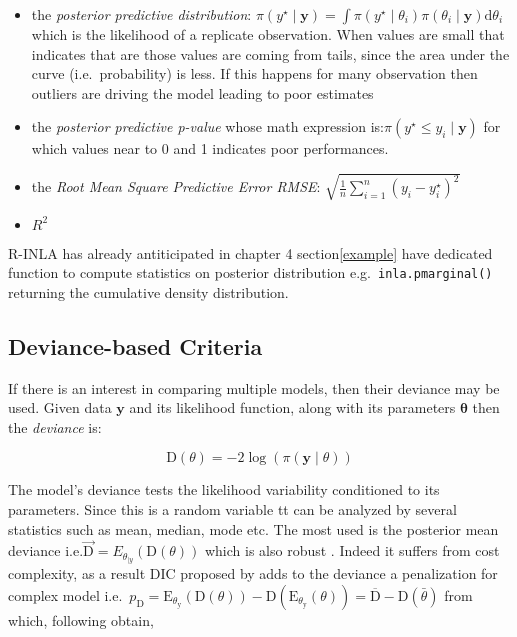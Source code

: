 \documentclass[
  12pt,
  a4paper,
  oneside]{book}
\newcommand{\passthrough}[1]{#1}
\providecommand{\tightlist}{%
  \setlength{\itemsep}{0pt}\setlength{\parskip}{0pt}}
\theoremstyle{definition}
\theoremstyle{definition}
\theoremstyle{definition}
\theoremstyle{remark}
\begin{document}
\begin{itemize}
\tightlist
\item
  the \emph{posterior predictive distribution}: \(\pi(y^{\star} \mid \boldsymbol{y}) = \int \pi(y^{\star} \mid \theta_{i})\pi({\theta_{i}} \mid \boldsymbol{y})\mathrm{d}\theta_{i}\) which is the likelihood of a replicate observation. When values are small that indicates that are those values are coming from tails, since the area under the curve (i.e.~probability) is less. If this happens for many observation then outliers are driving the model leading to poor estimates
\item
  the \emph{posterior predictive p-value} whose math expression is:\(\pi(y^{\star} \leq y_{i} \mid \boldsymbol{y})\) for which values near to 0 and 1 indicates poor performances.
\item
  the \emph{Root Mean Square Predictive Error RMSE}: \(\sqrt{\frac{1}{n} \sum_{i=1}^{n}(y_{i}-{y}^{\star}_{i})^{2}}\)
\item
  \(R^2\)
\end{itemize}

R-INLA has already antiticipated in chapter 4 section\ref{example} have dedicated function to compute statistics on posterior distribution e.g.~\passthrough{\lstinline!inla.pmarginal()!} returning the cumulative density distribution.

\hypertarget{devbased}{%
\subsection{Deviance-based Criteria}\label{devbased}}

If there is an interest in comparing multiple models, then their deviance may be used. Given data \(\boldsymbol{y}\) and its likelihood function, along with its parameters \(\boldsymbol\theta\) then the \emph{deviance} is:

\[
\mathrm{D}(\theta)=-2 \log (\pi(\boldsymbol{y} \mid \theta))
\]

The model's deviance tests the likelihood variability conditioned to its parameters. Since this is a random variable tt can be analyzed by several statistics such as mean, median, mode etc. The most used is the posterior mean deviance i.e.\(\overrightarrow{\mathrm{D}}=E_{\theta_{\mid y}}(\mathrm{D}(\theta))\) which is also robust \citep{Blangiaro-Cameletti}. Indeed it suffers from cost complexity, as a result DIC proposed by \citet{spiegelhalter2002bayesian} adds to the deviance a penalization for complex model i.e.~\(p_{\mathrm{D}}=\mathrm{E}_{\theta_{\mathrm{y}}}(\mathrm{D}(\theta))-\mathrm{D}\left(\mathrm{E}_{\theta_{\mathrm{y}}}(\theta)\right)=\overline{\mathrm{D}}-\mathrm{D}(\bar{\theta})\) from which, following \citet{Blangiaro-Cameletti} obtain,
\end{document}
